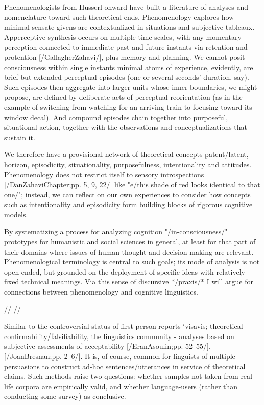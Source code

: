 Phenomenologists from Husserl onward have built a 
literature of analyses and nomenclature toward such 
theoretical ends.  Phenomenology explores how minimal sensate 
givens are contextualized in situations and subjective 
tableaux.  Apperceptive synthesis  
occurs on multiple time scales, with any momentary perception 
connected to immediate past and future instants via 
retention and protention [/GallagherZahavi/], plus 
memory and planning.  We cannot posit 
consciousness within single instants %
minimal atoms of experience, evidently, are brief 
but extended perceptual episodes (one or several 
seconds' duration, say).  Such episodes then aggregate into 
larger units whose inner boundaries, we might propose, 
are defined by deliberate acts of perceptual reorientation 
(as in the example of switching from watching for an 
arriving train to focusing toward its window decal).  And  
compound episodes chain together into purposeful, situational 
action, together with the observations and 
conceptualizations that sustain it.

We therefore have a provisional network of theoretical 
concepts %
patent/latent, horizon,
episodicity, situationality, purposefulness, intentionality 
and attitudes.  Phenomenology
does not restrict itself to sensory introspections [/DanZahaviChapter;pp. 5, 9, 22/]
like "e/this shade of red looks identical to that one/"; 
instead, we can reflect on our own experiences to 
consider how concepts such as intentionality and 
episodicity form building blocks of rigorous 
cognitive models.  

By systematizing a process  
for analyzing cognition "/in-consciousness/" 
prototypes for humanistic and social sciences in 
general, at least for that part of their 
domains where issues of human thought and decision-making 
are relevant.  Phenomenological terminology is 
central to such goals; its mode of analysis is not 
open-ended, but grounded on the deployment of 
specific ideas with relatively fixed technical 
meanings.  Via this sense of discursive */praxis/* I 
will argue for connections between phenomenology 
and cognitive linguistics.


// //

Similar to the controversial status of first-person reports 
`visavis; theoretical confirmability/falsifiability, the 
linguistics community -%
analyses based on subjective assessments of 
acceptability [/EranAsoulin;pp. 52--55/], [/JoanBresnan;pp. 2--6/].   
It is, of course, common for linguists of multiple persuasions 
to construct ad-hoc sentences/utterances in service 
of theoretical claims.  Such methods 
raise two questions: whether samples not taken from 
real-life corpora are empirically valid, and whether 
language-users %
(rather than conducting some survey) as conclusive.  

